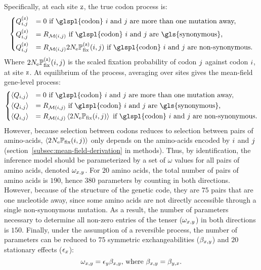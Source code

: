 Specifically, at each site $\text{z}$, the true \gls{codon} process is:
\begin{equation}
    \begin{dcases}
        \submatrix_{\itoj}\siteexp & = 0 \text{ if \glspl{codon} $\ci$ and $\cj$ are more than one mutation away,} \\
        \submatrix_{\itoj}\siteexp & = \mutmatrix_{\nucitoj} \text{ if \glspl{codon} $\ci$ and $\cj$ are \gls{synonymous},} \\
        \submatrix_{\itoj}\siteexp & = \mutmatrix_{\nucitoj} \Pfix\siteexp(\itoj) \text{ if \glspl{codon} $\ci$ and $\cj$ are non-synonymous}.
    \end{dcases}
    \label{eq:codon-site-processs}
\end{equation}
Where $2 N_{\text{e}} \mathbb{P}_{\text{fix}}^{(\text{z})}({i}, {j})$ is the scaled fixation probability of \gls{codon} ${j}$ against \gls{codon} ${i}$, at site $\text{z}$.
At equilibrium of the process, averaging over sites gives the mean-field gene-level process:
\begin{equation}
    \begin{dcases}
        \left\langle \submatrix_{\itoj} \right\rangle & = 0 \text{ if \glspl{codon} $\ci$ and $\cj$ are more than one mutation away,} \\
        \left\langle \submatrix_{\itoj} \right\rangle & = \mutmatrix_{\nucitoj} \text{ if \glspl{codon} $\ci$ and $\cj$ are \gls{synonymous},} \\
        \left\langle \submatrix_{\itoj} \right\rangle & = \mutmatrix_{\nucitoj} \left\langle \Pfix (\itoj) \right\rangle \text{ if \glspl{codon} $\ci$ and $\cj$ are non-synonymous}.
    \end{dcases}
    \label{eq:codon-avg-process}
\end{equation}
However, because selection between \glspl{codon} reduces to selection between pairs of amino-acids, $\left\langle 2 N_{\text{e}} \mathbb{P}_{\text{fix}} ({i}, {j}) \right\rangle$ only depends on the amino-acids encoded by ${i}$ and ${j}$ (section~\ref{subsec:mean-field-derivation} in methods).
Thus, by identification, the inference model should be parameterized by a set of $\omega$ values for all pairs of amino acids, denoted $\omega_{x, y}$.
For $20$ amino acids, the total number of pairs of amino acids is $190$, hence $380$ parameters by counting in both directions.
However, because of the structure of the genetic code, they are $75$ pairs that are one nucleotide away, since some amino acids are not directly accessible through a single \gls{non-synonymous} mutation.
As a result, the number of parameters necessary to determine all non-zero entries of the tenser ($\omega_{x, y}$) in both directions is $150$.
Finally, under the assumption of a reversible process, the number of parameters can be reduced to $75$ symmetric exchangeabilities ($\beta_{x, y}$) and $20$ stationary effects ($\epsilon_{x}$):
\begin{equation}
    \omega_{x, y} = \epsilon_{y} \beta_{x, y}\text{, where } \beta_{x, y} = \beta_{y, x}.\label{eq:omega-reversible}
\end{equation}

